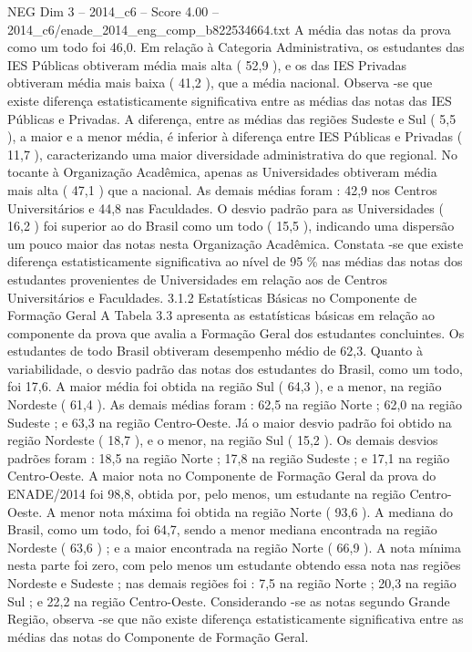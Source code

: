 \begin{textsample}{NEG Dim 3 – 2014\_c6 – Score 4.00 – 2014\_c6/enade\_2014\_eng\_comp\_b822534664.txt}
A média das notas da prova como um todo foi 46,0.
Em relação à Categoria Administrativa, os estudantes das IES Públicas obtiveram média mais alta ( 52,9 ), e os das IES Privadas obtiveram média mais baixa ( 41,2 ), que a média nacional.
Observa -se que existe diferença estatisticamente significativa entre as médias das notas das IES Públicas e Privadas.
A diferença, entre as médias das regiões Sudeste e Sul ( 5,5 ), a maior e a menor média, é inferior à diferença entre IES Públicas e Privadas ( 11,7 ), caracterizando uma maior diversidade administrativa do que regional.
No tocante à Organização Acadêmica, apenas as Universidades obtiveram média mais alta ( 47,1 ) que a nacional.
As demais médias foram : 42,9 nos Centros Universitários e 44,8 nas Faculdades.
O desvio padrão para as Universidades ( 16,2 ) foi superior ao do Brasil como um todo ( 15,5 ), indicando uma dispersão um pouco maior das notas nesta Organização Acadêmica.
Constata -se que existe diferença estatisticamente significativa ao nível de 95 \% nas médias das notas dos estudantes provenientes de Universidades em relação aos de Centros Universitários e Faculdades. 3.1.2 Estatísticas Básicas no Componente de Formação Geral A Tabela 3.3 apresenta as estatísticas básicas em relação ao componente da prova que avalia a Formação Geral dos estudantes concluintes.
Os estudantes de todo Brasil obtiveram desempenho médio de 62,3.
Quanto à variabilidade, o desvio padrão das notas dos estudantes do Brasil, como um todo, foi 17,6.
A maior média foi obtida na região Sul ( 64,3 ), e a menor, na região Nordeste ( 61,4 ).
As demais médias foram : 62,5 na região Norte ; 62,0 na região Sudeste ; e 63,3 na região Centro-Oeste.
Já o maior desvio padrão foi obtido na região Nordeste ( 18,7 ), e o menor, na região Sul ( 15,2 ).
Os demais desvios padrões foram : 18,5 na região Norte ; 17,8 na região Sudeste ; e 17,1 na região Centro-Oeste.
A maior nota no Componente de Formação Geral da prova do ENADE/2014 foi 98,8, obtida por, pelo menos, um estudante na região Centro-Oeste.
A menor nota máxima foi obtida na região Norte ( 93,6 ).
A mediana do Brasil, como um todo, foi 64,7, sendo a menor mediana encontrada na região Nordeste ( 63,6 ) ; e a maior encontrada na região Norte ( 66,9 ).
A nota mínima nesta parte foi zero, com pelo menos um estudante obtendo essa nota nas regiões Nordeste e Sudeste ; nas demais regiões foi : 7,5 na região Norte ; 20,3 na região Sul ; e 22,2 na região Centro-Oeste.
Considerando -se as notas segundo Grande Região, observa -se que não existe diferença estatisticamente significativa entre as médias das notas do Componente de Formação Geral.

\end{textsample}
